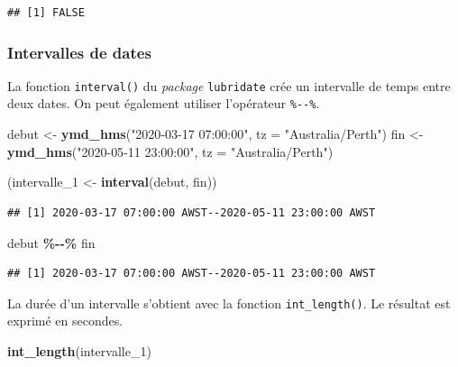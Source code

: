 \documentclass[
  11pt,
]{book}
\newenvironment{Shaded}{\begin{snugshade}}{\end{snugshade}}
\newcommand{\DataTypeTok}[1]{\textcolor[rgb]{0.13,0.29,0.53}{#1}}
\newcommand{\DecValTok}[1]{\textcolor[rgb]{0.00,0.00,0.81}{#1}}
\newcommand{\KeywordTok}[1]{\textcolor[rgb]{0.13,0.29,0.53}{\textbf{#1}}}
\newcommand{\NormalTok}[1]{#1}
\newcommand{\OperatorTok}[1]{\textcolor[rgb]{0.81,0.36,0.00}{\textbf{#1}}}
\newcommand{\StringTok}[1]{\textcolor[rgb]{0.31,0.60,0.02}{#1}}
\numberwithin{equation}{section}
\numberwithin{countremarque}{section}
\begin{document}
\begin{lstlisting}
## [1] FALSE
\end{lstlisting}

\hypertarget{intervalles-de-dates}{%
\subsubsection{Intervalles de dates}\label{intervalles-de-dates}}

La fonction \texttt{interval()} du \emph{package} \texttt{lubridate} crée un intervalle de temps entre deux dates. On peut également utiliser l'opérateur \texttt{\%-\/-\%}.

\begin{Shaded}
\begin{Highlighting}[]
\NormalTok{debut \textless{}{-}}\StringTok{ }\KeywordTok{ymd\_hms}\NormalTok{(}\StringTok{"2020{-}03{-}17 07:00:00"}\NormalTok{, }\DataTypeTok{tz =} \StringTok{"Australia/Perth"}\NormalTok{)}
\NormalTok{fin \textless{}{-}}\StringTok{ }\KeywordTok{ymd\_hms}\NormalTok{(}\StringTok{"2020{-}05{-}11 23:00:00"}\NormalTok{, }\DataTypeTok{tz =} \StringTok{"Australia/Perth"}\NormalTok{)}

\NormalTok{(intervalle\_}\DecValTok{1}\NormalTok{ \textless{}{-}}\StringTok{ }\KeywordTok{interval}\NormalTok{(debut, fin))}
\end{Highlighting}
\end{Shaded}

\begin{lstlisting}
## [1] 2020-03-17 07:00:00 AWST--2020-05-11 23:00:00 AWST
\end{lstlisting}

\begin{Shaded}
\begin{Highlighting}[]
\NormalTok{debut }\OperatorTok{\%{-}{-}\%}\StringTok{ }\NormalTok{fin}
\end{Highlighting}
\end{Shaded}

\begin{lstlisting}
## [1] 2020-03-17 07:00:00 AWST--2020-05-11 23:00:00 AWST
\end{lstlisting}

La durée d'un intervalle s'obtient avec la fonction \texttt{int\_length()}. Le résultat est exprimé en secondes.

\begin{Shaded}
\begin{Highlighting}[]
\KeywordTok{int\_length}\NormalTok{(intervalle\_}\DecValTok{1}\NormalTok{)}
\end{Highlighting}
\end{Shaded}
\end{document}
